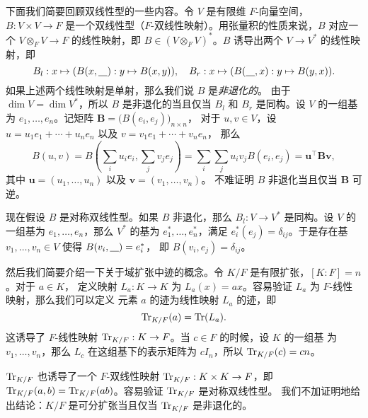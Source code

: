 下面我们简要回顾双线性型的一些内容。令 $V$ 是有限维 $F$-向量空间，$B:V\times V\to F$
是一个双线性型（$F$-双线性映射）。用张量积的性质来说，$B$ 对应一个 $V\otimes_F V\to F$
的线性映射，即 $B\in (V\otimes_F V)^*$。$B$ 诱导出两个 $V\to V^*$ 的线性映射，即
\[
  B_l:x\mapsto (B(x,\uline{}):y\mapsto B(x,y)) ,\quad
  B_r:x\mapsto (B(\uline{},x):y\mapsto B(y,x)) .
\]
如果上述两个线性映射是单射，那么我们说 $B$ 是\emph{非退化的}。
由于 $\dim V=\dim V^*$，所以 $B$ 是非退化的当且仅当 $B_l$ 和 $B_r$
是同构。设 $V$ 的一组基为 $e_1,\dots,e_n$。记矩阵 $\mathbold B=\bigl(B(e_i,e_j)\bigr)_{n\times n}$，
对于 $u,v\in V$，设 $u=u_1e_1+\cdots+u_ne_n$ 以及 $v=v_1e_1+\cdots+v_ne_n$，
那么
\[
  B(u,v)=B\left(\sum_i u_ie_i,\sum_j v_je_j\right)  =
  \sum_i\sum_j u_iv_jB(e_i,e_j)=\mathbold u^\top\mathbold B\mathbold v,
\]
其中 $\mathbold u=(u_1,\dots,u_n)$ 以及 $\mathbold v=(v_1,\dots,v_n)$。
不难证明 $B$ 非退化当且仅当 $\mathbold B$ 可逆。

现在假设 $B$ 是对称双线性型。如果 $B$ 非退化，那么 $B_l:V\to V^*$
是同构。设 $V$ 的一组基为 $e_1,\dots,e_n$，那么 $V^*$ 的基为 $e_1^*,\dots,e_n^*$，满足
$e_i^*(e_j)=\delta_{ij}$。于是存在基 $v_1,\dots,v_n\in V$ 使得 $B(v_i,\uline)=e_i^*$，
即 $B(v_i,e_j)=\delta_{ij}$。

然后我们简要介绍一下关于域扩张中迹的概念。令 $K/F$ 是有限扩张，$[K:F]=n$。对于 $a\in K$，
定义映射 $L_a:K\to K$ 为 $L_a(x)=ax$。容易验证 $L_a$ 为 $F$-线性映射，那么我们可以定义
元素 $a$ 的迹为线性映射 $L_a$ 的迹，即
\[
  \operatorname{Tr}_{K/F}(a)=\operatorname{Tr}(L_a).  
\]
这诱导了 $F$-线性映射 $\operatorname{Tr}_{K/F}:K\to F$。当 $c\in F$ 的时候，设 $K$ 的一组基
为 $v_1,\dots,v_n$，那么 $L_c$ 在这组基下的表示矩阵为 $cI_n$，所以
$\operatorname{Tr}_{K/F}(c)=cn$。

$\operatorname{Tr}_{K/F}$ 也诱导了一个 $F$-双线性映射 $\operatorname{Tr}_{K/F}:K\times K\to F$，即
$\operatorname{Tr}_{K/F}(a,b)=\operatorname{Tr}_{K/F}(ab)$。容易验证 $\operatorname{Tr}_{K/F}$ 是对称双线性型。
我们不加证明地给出结论：$K/F$ 是可分扩张当且仅当 $\operatorname{Tr}_{K/F}$ 是非退化的。

